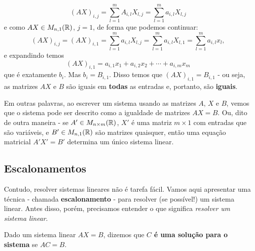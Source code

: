 \[(AX)_{i,j}=\sum_{l=1}^m A_{i,l}X_{l,j}=\sum_{l=1}^m a_{i,l}X_{l,j}\]e como $AX\in M_{n,1}(\mathbb R)$, $j=1$, de forma que podemos continuar:
\[(AX)_{i,j}=(AX)_{i,1}=\sum_{l=1}^m a_{i,l}X_{l,j}=\sum_{l=1}^m a_{i,l}X_{l,1}=\sum_{l=1}^m a_{i,l}x_l,\]e expandindo temos
\[(AX)_{i,1}=a_{i,1}x_1+a_{i,2}x_2+\cdots+a_{i,m}x_m\]que é exatamente $b_i$. Mas $b_i=B_{i,1}$. Disso temos que $(AX)_{i,1}=B_{i,1}$ - ou seja, as matrizes $AX$ e $B$ são iguais em \textbf{todas} as entradas e, portanto, são \textbf{iguais}.

Em outras palavras, ao escrever um sistema usando as matrizes $A$, $X$ e $B$, vemos que o sistema pode ser descrito como a igualdade de matrizes $AX=B$. Ou, dito de outra maneira - se $A'\in M_{n\times m}(\mathbb R)$, $X'$ é uma matriz $m\times 1$ com entradas que são variáveis, e $B'\in M_{n,1}(\mathbb R)$ são matrizes quaisquer, então uma equação matricial $A'X'=B'$ determina um único sistema linear.

\subsection{Escalonamentos}

Contudo, resolver sistemas lineares não é tarefa fácil. Vamos aqui apresentar uma técnica - chamada \textbf{escalonamento} - para resolver (se possível!) um sistema linear. Antes disso, porém, precisamos entender o que significa \textit{resolver um sistema linear}.

\begin{df}
	Dado um sistema linear $AX=B$, dizemos que \textbf{$C$ é uma solução para o sistema} se $AC=B$.
\end{df}


